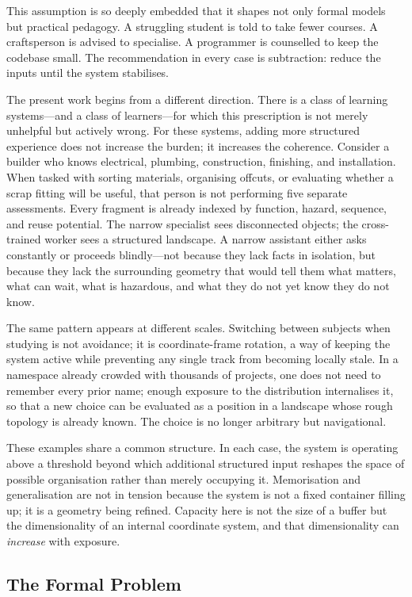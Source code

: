 \documentclass[12pt,oneside]{article}
\theoremstyle{plain}
\theoremstyle{definition}
\theoremstyle{remark}
\begin{document}
This assumption is so deeply embedded that it shapes not only formal models but
practical pedagogy. A struggling student is told to take fewer courses. A
craftsperson is advised to specialise. A programmer is counselled to keep the
codebase small. The recommendation in every case is subtraction: reduce the
inputs until the system stabilises.

The present work begins from a different direction. There is a class of learning
systems---and a class of learners---for which this prescription is not merely
unhelpful but actively wrong. For these systems, adding more structured
experience does not increase the burden; it increases the coherence. Consider a
builder who knows electrical, plumbing, construction, finishing, and installation.
When tasked with sorting materials, organising offcuts, or evaluating whether a
scrap fitting will be useful, that person is not performing five separate
assessments. Every fragment is already indexed by function, hazard, sequence, and
reuse potential. The narrow specialist sees disconnected objects; the
cross-trained worker sees a structured landscape. A narrow assistant either asks
constantly or proceeds blindly---not because they lack facts in isolation, but
because they lack the surrounding geometry that would tell them what matters,
what can wait, what is hazardous, and what they do not yet know they do not know.

The same pattern appears at different scales. Switching between subjects when
studying is not avoidance; it is coordinate-frame rotation, a way of keeping the
system active while preventing any single track from becoming locally stale. In
a namespace already crowded with thousands of projects, one does not need to
remember every prior name; enough exposure to the distribution internalises it,
so that a new choice can be evaluated as a position in a landscape whose rough
topology is already known. The choice is no longer arbitrary but navigational.

These examples share a common structure. In each case, the system is operating
above a threshold beyond which additional structured input reshapes the space of
possible organisation rather than merely occupying it. Memorisation and
generalisation are not in tension because the system is not a fixed container
filling up; it is a geometry being refined. Capacity here is not the size of a
buffer but the dimensionality of an internal coordinate system, and that
dimensionality can \emph{increase} with exposure.

\subsection{The Formal Problem}
\end{document}
